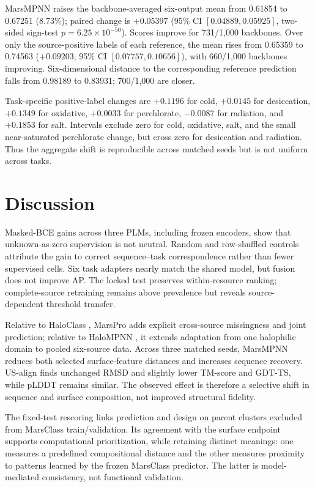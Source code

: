 \documentclass[conference]{IEEEtran}
\begin{document}
MarsMPNN raises the backbone-averaged six-output mean from 0.61854 to 0.67251 (8.73\%); paired change is $+0.05397$ (95\% CI $[0.04889,0.05925]$, two-sided sign-test $p=6.25\times10^{-50}$). Scores improve for 731/1,000 backbones. Over only the source-positive labels of each reference, the mean rises from 0.65359 to 0.74563 ($+0.09203$; 95\% CI $[0.07757,0.10656]$), with 660/1,000 backbones improving. Six-dimensional distance to the corresponding reference prediction falls from 0.98189 to 0.83931; 700/1,000 are closer.

Task-specific positive-label changes are $+0.1196$ for cold, $+0.0145$ for desiccation, $+0.1349$ for oxidative, $+0.0033$ for perchlorate, $-0.0087$ for radiation, and $+0.1853$ for salt. Intervals exclude zero for cold, oxidative, salt, and the small near-saturated perchlorate change, but cross zero for desiccation and radiation. Thus the aggregate shift is reproducible across matched seeds but is not uniform across tasks.

\section{Discussion}\label{sec:discussion}

Masked-BCE gains across three PLMs, including frozen encoders, show that unknown-as-zero supervision is not neutral. Random and row-shuffled controls attribute the gain to correct sequence--task correspondence rather than fewer supervised cells. Six task adapters nearly match the shared model, but fusion does not improve AP. The locked test preserves within-resource ranking; complete-source retraining remains above prevalence but reveals source-dependent threshold transfer.

Relative to HaloClass \cite{ref1}, MarsPro adds explicit cross-source missingness and joint prediction; relative to HaloMPNN \cite{ref6}, it extends adaptation from one halophilic domain to pooled six-source data. Across three matched seeds, MarsMPNN reduces both selected surface-feature distances and increases sequence recovery. US-align finds unchanged RMSD and slightly lower TM-score and GDT-TS, while pLDDT remains similar. The observed effect is therefore a selective shift in sequence and surface composition, not improved structural fidelity.

The fixed-test rescoring links prediction and design on parent clusters excluded from MarsClass train/validation. Its agreement with the surface endpoint supports computational prioritization, while retaining distinct meanings: one measures a predefined compositional distance and the other measures proximity to patterns learned by the frozen MarsClass predictor. The latter is model-mediated consistency, not functional validation.
\end{document}
